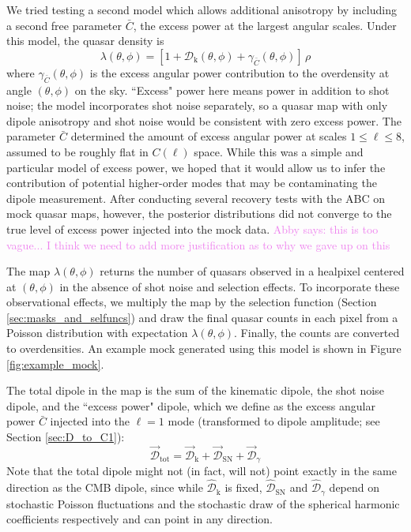 \documentclass[modern]{aastex631}
\newcommand{\abby}[1]{\textcolor{violet}{Abby says: #1}}
\begin{document}
We tried testing a second model which allows additional anisotropy by including a second free parameter $\bar C$, the excess power at the largest angular scales.
Under this model, the quasar density is
\begin{equation}
    \lambda(\theta,\phi) = \left[1 + \mathcal{D}_\mathrm{k}(\theta,\phi) + \gamma_{\bar C}(\theta, \phi)\right]\,\rho
\end{equation}
where $\gamma_{\bar C}(\theta,\phi)$ is the excess angular power contribution to the overdensity at angle $(\theta,\phi)$ on the sky.
``Excess" power here means power in addition to shot noise; the model incorporates shot noise separately, so a quasar map with only dipole anisotropy and shot noise would be consistent with zero excess power.
The parameter $\bar C$ determined the amount of excess angular power at scales $1\le \ell\le 8$, assumed to be roughly flat in $C(\ell)$ space.
While this was a simple and particular model of excess power, we hoped that it would allow us to infer the contribution of potential higher-order modes that may be contaminating the dipole measurement.
After conducting several recovery tests with the ABC on mock quasar maps, however, the posterior distributions did not converge to the true level of excess power injected into the mock data.
\abby{this is too vague... I think we need to add more justification as to why we gave up on this}

The map $\lambda(\theta,\phi)$ returns the number of quasars observed in a healpixel centered at $(\theta,\phi)$ in the absence of shot noise and selection effects.
To incorporate these observational effects, we multiply the map by the selection function (Section \ref{sec:masks_and_selfuncs}) and draw the final quasar counts in each pixel from a Poisson distribution with expectation $\lambda(\theta,\phi)$.
Finally, the counts are converted to overdensities.
An example mock generated using this model is shown in Figure \ref{fig:example_mock}.

The total dipole in the map is the sum of the kinematic dipole, the shot noise dipole, and the ``excess power" dipole, which we define as the excess angular power $\bar C$ injected into the $\ell=1$ mode (transformed to dipole amplitude; see Section \ref{sec:D_to_C1}):
\begin{equation}
    \vec{\mathcal{D}}_\mathrm{tot}=\vec{\mathcal{D}}_\mathrm{k} + \vec{\mathcal{D}}_\mathrm{SN} +\vec{\mathcal{D}}_\gamma 
\end{equation}
Note that the total dipole might not (in fact, will not) point exactly in the same direction as the CMB dipole, since while $\hat{\mathcal{D}}_\mathrm{k}$ is fixed, $\hat{\mathcal{D}}_\mathrm{SN}$ and $\hat{\mathcal{D}}_\gamma$ depend on stochastic Poisson fluctuations and the stochastic draw of the spherical harmonic coefficients respectively and can point in any direction.
\end{document}
